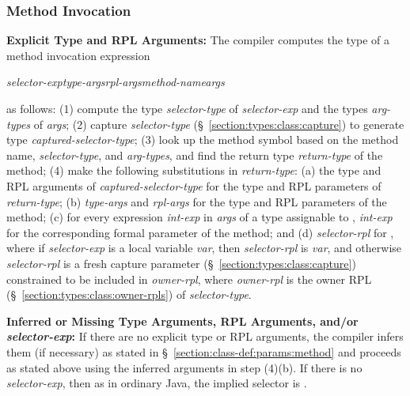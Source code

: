 \subsubsection{Method Invocation}
\label{section:types:exp:invocation}

\textbf{Explicit Type and RPL Arguments:} The compiler computes the
type of a method invocation expression
%
\begin{description}
%
\item
  \emph{selector-exp}\emph{type-args}\kwd{,}\emph{rpl-args}\kwd{>}\emph{method-name}\kwd{(}\emph{args}\kwd{)}
%
\end{description}
%
as follows: (1) compute the type \emph{selector-type} of
\emph{selector-exp} and the types \emph{arg-types} of \emph{args}; (2)
capture \emph{selector-type} (\S~\ref{section:types:class:capture}) to
generate type \emph{captured-selector-type}; (3) look up the method
symbol based on the method name, \emph{selector-type}, and
\emph{arg-types}, and find the return type \emph{return-type} of the
method; (4) make the following substitutions in \emph{return-type}:
(a) the type and RPL arguments of \emph{captured-selector-type} for
the type and RPL parameters of \emph{return-type}; (b)
\emph{type-args} and \emph{rpl-args} for the type and RPL parameters
of the method; (c) for every expression \emph{int-exp} in \emph{args}
of a type assignable to , \emph{int-exp} for the
corresponding formal parameter of the method; and (d)
\emph{selector-rpl} for , where if \emph{selector-exp} is a
 local variable \emph{var}, then \emph{selector-rpl} is
\emph{var}, and otherwise \emph{selector-rpl} is a fresh capture
parameter (\S~\ref{section:types:class:capture}) constrained to be
included in \emph{owner-rpl}\kwd{:*}, where \emph{owner-rpl} is the
owner RPL (\S~\ref{section:types:class:owner-rpls}) of
\emph{selector-type}.

\noindent
\textbf{Inferred or Missing Type Arguments, RPL Arguments, and/or
  \emph{selector-exp}:} If there are no explicit type or RPL
arguments, the compiler infers them (if necessary) as stated in
\S~\ref{section:class-def:params:method} and proceeds as stated above
using the inferred arguments in step (4)(b).  If there is no
\emph{selector-exp}, then as in ordinary Java, the implied selector is
.


